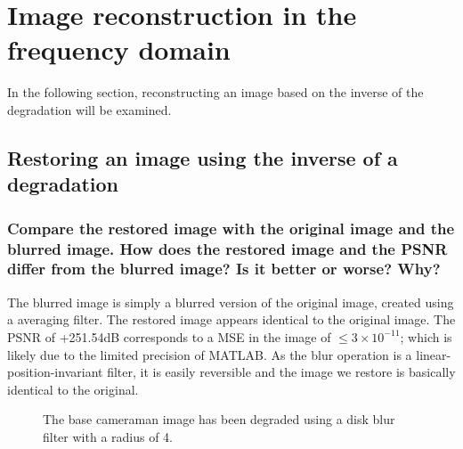 \documentclass[article, 1.5space, letterpaper, 12pt, oneside, header, footer]{SydeClass}
\begin{document}
\clearpage
\section{Image reconstruction in the frequency domain}

In the following section, reconstructing an image based on the inverse of the degradation will be examined.

\subsection{Restoring an image using the inverse of a degradation}

\subsubsection{Compare the restored image with the original image and the blurred image. How does the restored image and the PSNR differ from the blurred image? Is it better or worse? Why?}
The blurred image is simply a blurred version of the original image, created using a averaging filter. The restored image appears identical to the original image. The PSNR of +251.54dB corresponds to a MSE in the image of $\leq 3\times{10}^{-11}$; which is likely due to the limited precision of MATLAB. As the blur operation is a linear-position-invariant filter, it is easily reversible and the image we restore is basically identical to the original.


\begin{figure}[ht]
\centering
	\caption{The base cameraman image has been degraded using a disk blur filter with a radius of 4.}
\end{figure}
\end{document}
